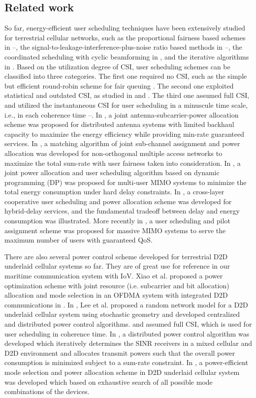 \documentclass{ieeeaccess}
\begin{document}
\subsection{Related work}
So far, energy-efficient user scheduling techniques have been extensively studied for terrestrial cellular networks, such as the proportional fairness based schemes in \cite{p61}--\cite{p63}, the signal-to-leakage-interference-plus-noise ratio based methods in \cite{p64}--\cite{p66}, the coordinated scheduling with cyclic beamforming in \cite{p67}\cite{p68}, and the iterative algorithms in \cite{p69}\cite{p70}. Based on the utilization degree of CSI, user scheduling schemes can be classified into three categories. The first one required no CSI, such as the simple but efficient round-robin scheme for fair queuing \cite{p51}. The second one exploited statistical and outdated CSI, as studied in \cite{p52} and \cite{p53}. The third one assumed full CSI, and utilized the instantaneous CSI for user scheduling in a minuscule time scale, i.e., in each coherence time \cite{p3}--\cite{p7}. In \cite{p3}, a joint antenna-subcarrier-power allocation scheme was proposed for distributed antenna systems with limited backhaul capacity to maximize the energy efficiency while providing min-rate guaranteed services. In \cite{p6}, a matching algorithm of joint sub-channel assignment and power allocation was developed for non-orthogonal multiple access networks to maximize the total sum-rate with user fairness taken into consideration. In \cite{p4}, a joint power allocation and user scheduling algorithm based on dynamic programming (DP) was proposed for multi-user MIMO systems to minimize the total energy consumption under hard delay constraints. In \cite{p5}, a cross-layer cooperative user scheduling and power allocation scheme was developed for hybrid-delay services, and the fundamental tradeoff between delay and energy consumption was illustrated. More recently in \cite{p7}, a user scheduling and pilot assignment scheme was proposed for massive MIMO systems to serve the maximum number of users with guaranteed QoS.

There are also several power control scheme developed for terrestrial D2D underlaid cellular systems so far. They are of great use for reference in our maritime communication system with IoV. Xiao et al. proposed a power optimization scheme with joint resource (i.e. subcarrier and bit allocation) allocation and mode selection in an OFDMA system with integrated D2D communications in \cite{p801}. In \cite{p802}, Lee et al. proposed a random network model for a D2D underlaid cellular system using stochastic geometry and developed centralized and distributed power control algorithms. \cite{p801} and \cite{p802} assumed full CSI, which is used for user scheduling in coherence time. In \cite{p803}, a distributed power control algorithm was developed which iteratively determines the SINR receivers in a mixed cellular and D2D environment and allocates transmit powers such that the overall power consumption is minimized subject to a sum-rate constraint. In \cite{p804}, a power-efficient mode selection and power allocation scheme in D2D underlaid cellular system was developed which based on exhaustive search of all possible mode combinations of the devices.  
\end{document}
